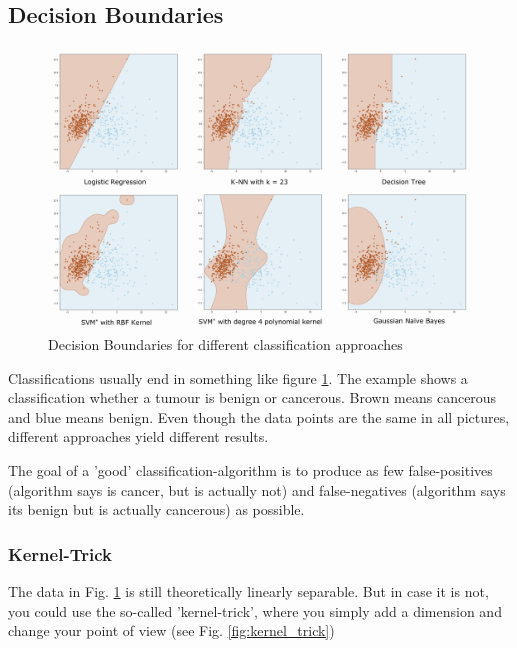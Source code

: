 \documentclass[11pt]{article}
\begin{document}
\subsection{Decision Boundaries}

\begin{figure}[htb!]
    \centering
    \includegraphics[keepaspectratio=true, width=\linewidth]{decision_boundaries.png}
    \caption{Decision Boundaries for different classification approaches}
    \label{fig:decision_boundaries}
\end{figure}

Classifications usually end in something like figure \ref{fig:decision_boundaries}. The example shows a classification whether a tumour is benign or cancerous. Brown means cancerous and blue means benign. Even though the data points are the same in all pictures, different approaches yield different results.

The goal of a 'good' classification-algorithm is to produce as few false-positives (algorithm says is cancer, but is actually not) and false-negatives (algorithm says its benign but is actually cancerous) as possible.

\subsubsection{Kernel-Trick}
The data in Fig. \ref{fig:decision_boundaries} is still theoretically linearly separable. But in case it is not, you could use the so-called 'kernel-trick', where you simply add a dimension and change your point of view (see Fig. \ref{fig:kernel_trick})
\end{document}
